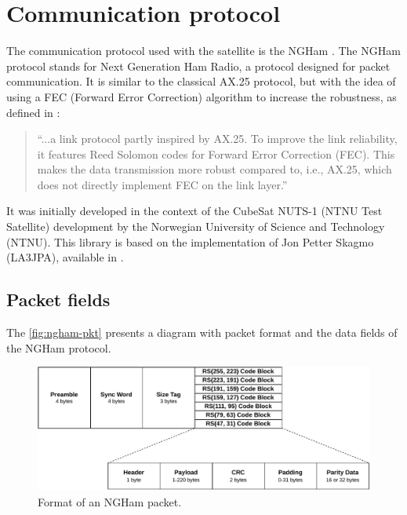 \section{Communication protocol}

The communication protocol used with the satellite is the NGHam \cite{pyngham-doc}. The NGHam protocol stands for Next Generation Ham Radio, a protocol designed for packet communication. It is similar to the classical AX.25 \cite{ax25} protocol, but with the idea of using a FEC (Forward Error Correction) algorithm to increase the robustness, as defined in \cite{lofaldli2016}:

\begin{quote}
``...a link protocol partly inspired by AX.25. To improve the link reliability, it features Reed Solomon codes for Forward Error Correction (FEC). This makes the data transmission more robust compared to, i.e., AX.25, which does not directly implement FEC on the link layer.''
\end{quote}

It was initially developed in the context of the CubeSat NUTS-1 (NTNU Test Satellite) development by the Norwegian University of Science and Technology (NTNU). This library is based on the implementation of Jon Petter Skagmo (LA3JPA), available in \cite{ngham}.

\subsection{Packet fields}

The \autoref{fig:ngham-pkt} presents a diagram with packet format and the data fields of the NGHam protocol.

\begin{figure}[!ht]
    \begin{center}
        \includegraphics[width=\textwidth]{figures/ngham-pkt.pdf}
        \caption{Format of an NGHam packet.}
        \label{fig:ngham-pkt}
    \end{center}
\end{figure}

